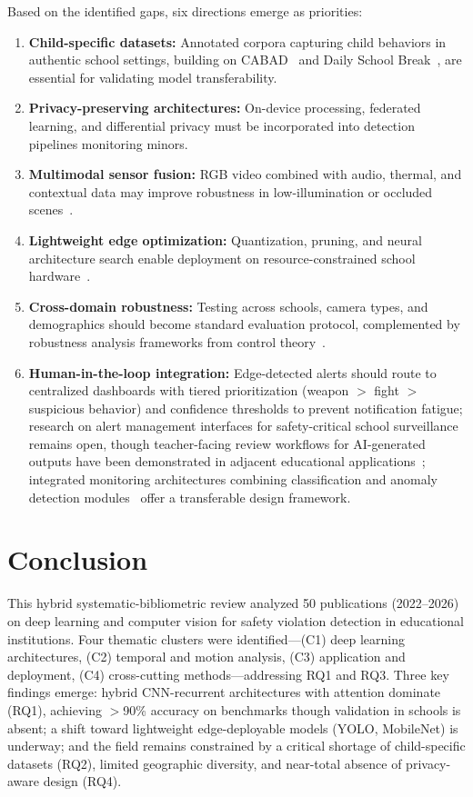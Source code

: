\documentclass[conference]{IEEEtran}
\begin{document}
Based on the identified gaps, six directions emerge as priorities:
\begin{enumerate}
\item \textbf{Child-specific datasets:} Annotated corpora capturing child behaviors in authentic school settings, building on CABAD~\cite{b15} and Daily School Break~\cite{b11}, are essential for validating model transferability.
\item \textbf{Privacy-preserving architectures:} On-device processing, federated learning, and differential privacy must be incorporated into detection pipelines monitoring minors.
\item \textbf{Multimodal sensor fusion:} RGB video combined with audio, thermal, and contextual data may improve robustness in low-illumination or occluded scenes~\cite{b21,b22}.
\item \textbf{Lightweight edge optimization:} Quantization, pruning, and neural architecture search enable deployment on resource-constrained school hardware~\cite{b7,b23}.
\item \textbf{Cross-domain robustness:} Testing across schools, camera types, and demographics should become standard evaluation protocol, complemented by robustness analysis frameworks from control theory~\cite{b25}.
\item \textbf{Human-in-the-loop integration:} Edge-detected alerts should route to centralized dashboards with tiered prioritization (weapon $>$ fight $>$ suspicious behavior) and confidence thresholds to prevent notification fatigue; research on alert management interfaces for safety-critical school surveillance remains open, though teacher-facing review workflows for AI-generated outputs have been demonstrated in adjacent educational applications~\cite{b28}; integrated monitoring architectures combining classification and anomaly detection modules~\cite{b24,b27} offer a transferable design framework.
\end{enumerate}

\section{Conclusion}

This hybrid systematic-bibliometric review analyzed 50 publications (2022--2026) on deep learning and computer vision for safety violation detection in educational institutions. Four thematic clusters were identified---(C1) deep learning architectures, (C2) temporal and motion analysis, (C3) application and deployment, (C4) cross-cutting methods---addressing RQ1 and RQ3. Three key findings emerge: hybrid CNN-recurrent architectures with attention dominate (RQ1), achieving $>$90\% accuracy on benchmarks though validation in schools is absent; a shift toward lightweight edge-deployable models (YOLO, MobileNet) is underway; and the field remains constrained by a critical shortage of child-specific datasets (RQ2), limited geographic diversity, and near-total absence of privacy-aware design (RQ4).
\end{document}
